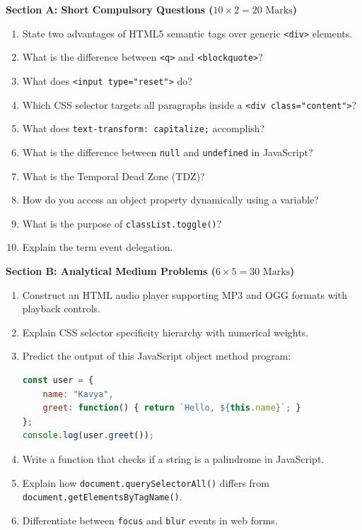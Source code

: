 \begin{mockexam}
\noindent\textbf{Section A: Short Compulsory Questions ($10 \times 2 = 20\text{ Marks}$)}
\begin{enumerate}[leftmargin=1.5em]
    \item State two advantages of HTML5 semantic tags over generic \texttt{<div>} elements.
    \item What is the difference between \texttt{<q>} and \texttt{<blockquote>}?
    \item What does \texttt{<input type="reset">} do?
    \item Which CSS selector targets all paragraphs inside a \texttt{<div class="content">}?
    \item What does \texttt{text-transform: capitalize;} accomplish?
    \item What is the difference between \texttt{null} and \texttt{undefined} in JavaScript?
    \item What is the Temporal Dead Zone (TDZ)?
    \item How do you access an object property dynamically using a variable?
    \item What is the purpose of \texttt{classList.toggle()}?
    \item Explain the term event delegation.
\end{enumerate}

\medskip
\noindent\textbf{Section B: Analytical Medium Problems ($6 \times 5 = 30\text{ Marks}$)}
\begin{enumerate}[leftmargin=1.5em, start=11]
    \item Construct an HTML audio player supporting MP3 and OGG formats with playback controls.
    \item Explain CSS selector specificity hierarchy with numerical weights.
    \item Predict the output of this JavaScript object method program:
    \begin{lstlisting}[language=JavaScript]
const user = {
    name: "Kavya",
    greet: function() { return `Hello, ${this.name}`; }
};
console.log(user.greet());
    \end{lstlisting}
    \item Write a function that checks if a string is a palindrome in JavaScript.
    \item Explain how \texttt{document.querySelectorAll()} differs from \texttt{document.getElementsByTagName()}.
    \item Differentiate between \texttt{focus} and \texttt{blur} events in web forms.
\end{enumerate}


\end{mockexam}
